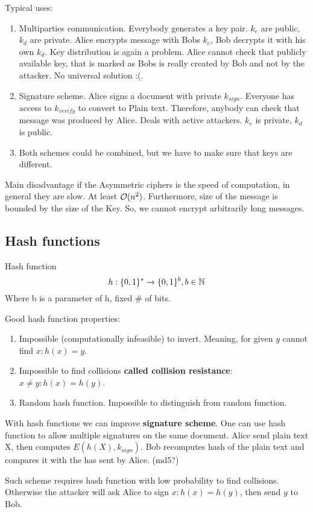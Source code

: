 Typical uses:
\begin{enumerate}
	\item Multiparties communication. Everybody generates a key pair. $k_e$ are public, $k_d$ are private.
		Alice encrypts message with Bobs $k_e$, Bob decrypts it with his own $k_d$.
		Key distribution is again a problem. Alice cannot check that publicly available key, that is marked as Bobs is really created by Bob and not by the attacker.
		No universal solution :(.
	\item Signature scheme.
		Alice signs a document with private $k_{sign}$. Everyone has access to $k_{verify}$ to convert to Plain text. Therefore, anybody can check that message was produced by Alice.
		Deals with active attackers. $k_e$ is private, $k_d$ is public.
	\item Both schemes could be combined, but we have to make sure that keys are different.
\end{enumerate}

Main disadvantage if the Asymmetric ciphers is the speed of computation, in general they are slow. At least $\mathcal{O}(n^2)$.
Furthermore, size of the message is bounded by the size of the Key. So, we cannot encrypt arbitrarily long messages.

\subsection{Hash functions}
\begin{definition}
	Hash function
	\[ h: \{0, 1\}^{\ast} \to \{0, 1\}^b, b \in \operatorname{\mathbb{N}} \]
	Where b is a parameter of h, fixed \# of bits.
\end{definition}
\begin{propertiesBasic}
	Good hash function properties:
	\begin{enumerate}
		\item Impossible (computationally infeasible) to invert. Meaning, for given $y$ cannot find $x: h(x) = y$.
		\item Impossible to find collisions \textbf{called collision resistance}: $x \ne y: h(x) = h(y)$.
		\item Random hash function. Impossible to distinguish from random function.
	\end{enumerate}
\end{propertiesBasic}

\begin{example}
	With hash functions we can improve \textbf{signature scheme}. One can use hash function to allow multiple signatures on the same document.
	Alice send plain text X, then computes $E(h(X), k_{sign})$. Bob recomputes hash of the plain text and compares it with the has sent by Alice. (md5?)

	Such scheme requires hash function with low probability to find collisions. Otherwise the attacker will ask Alice to sign $x: h(x) = h(y)$, then send $y$ to Bob.
\end{example}

